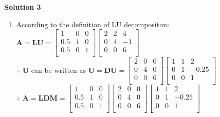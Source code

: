 \documentclass[english,onecolumn]{IEEEtran}
\begin{document}
\noindent\textbf{Solution 3}
\begin{enumerate}
	\item 
	According to the definition of LU decompositon:
	$\mathbf{A}=\mathbf{L}\mathbf{U}=
		\begin{bmatrix}
			1 & 0 & 0\\
			0.5 & 1 & 0\\
			0.5 & 0 & 1\\
		\end{bmatrix}
		\begin{bmatrix}
			2 & 2 & 4\\
			0 & 4 & -1\\
			0 & 0 & 6\\
		\end{bmatrix}  $\\
    $\therefore$ $\mathbf{U}$ can be written as 
    $\mathbf{U}=\mathbf{D}\mathbf{U}=
    \begin{bmatrix}
    2 & 0 & 0\\
    0 & 4 & 0\\
    0 & 0 & 6\\
    \end{bmatrix}
    \begin{bmatrix}
	1 & 1 & 2\\
	0 & 1 & -0.25\\
	0 & 0 & 1\\
	\end{bmatrix}$\\
	$\therefore$ $\mathbf{A}=\mathbf{L}\mathbf{D}\mathbf{M}=
		\begin{bmatrix}
			1 & 0 & 0\\
			0.5 & 1 & 0\\
			0.5 & 0 & 1\\
		\end{bmatrix}
		\begin{bmatrix}
			2 & 0 & 0\\
			0 & 4 & 0\\
			0 & 0 & 6\\
		\end{bmatrix}
		\begin{bmatrix}
			1 & 1 & 2\\
			0 & 1 & -0.25\\
			0 & 0 & 1\\
		\end{bmatrix}				$
	\\\\
    
    
    

\end{enumerate}
\end{document}
